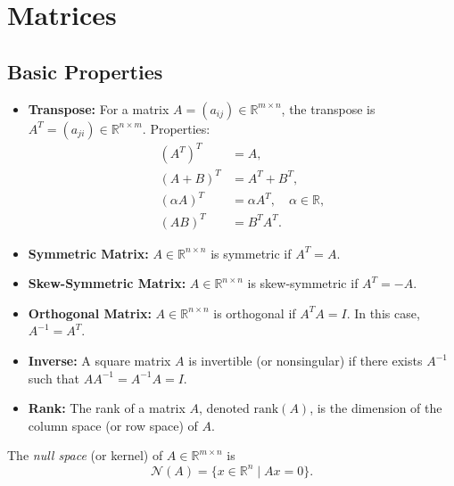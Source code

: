 \section{Matrices}

\subsection{Basic Properties}

\begin{itemize}
    \item \textbf{Transpose:} For a matrix $A=(a_{ij}) \in \mathbb{R}^{m \times n}$, the transpose is $A^T=(a_{ji}) \in \mathbb{R}^{n \times m}$.  
    Properties:
    \begin{align*}
        (A^T)^T &= A, \\
        (A+B)^T &= A^T + B^T, \\
        (\alpha A)^T &= \alpha A^T, \quad \alpha \in \mathbb{R}, \\
        (AB)^T &= B^T A^T.
    \end{align*}
    
    \item \textbf{Symmetric Matrix:} $A \in \mathbb{R}^{n \times n}$ is symmetric if $A^T = A$.

    \item \textbf{Skew-Symmetric Matrix:} $A \in \mathbb{R}^{n \times n}$ is skew-symmetric if $A^T = -A$.

    \item \textbf{Orthogonal Matrix:} $A \in \mathbb{R}^{n \times n}$ is orthogonal if $A^T A = I$.  
    In this case, $A^{-1} = A^T$.

    \item \textbf{Inverse:} A square matrix $A$ is invertible (or nonsingular) if there exists $A^{-1}$ such that $AA^{-1}=A^{-1}A=I$.

    \item \textbf{Rank:} The rank of a matrix $A$, denoted $\mathrm{rank}(A)$, is the dimension of the column space (or row space) of $A$.
\end{itemize}

\begin{definition}
The \emph{null space} (or kernel) of $A \in \mathbb{R}^{m \times n}$ is
\[
\mathcal{N}(A) = \{x \in \mathbb{R}^n \mid Ax = 0\}.
\]
\end{definition}

